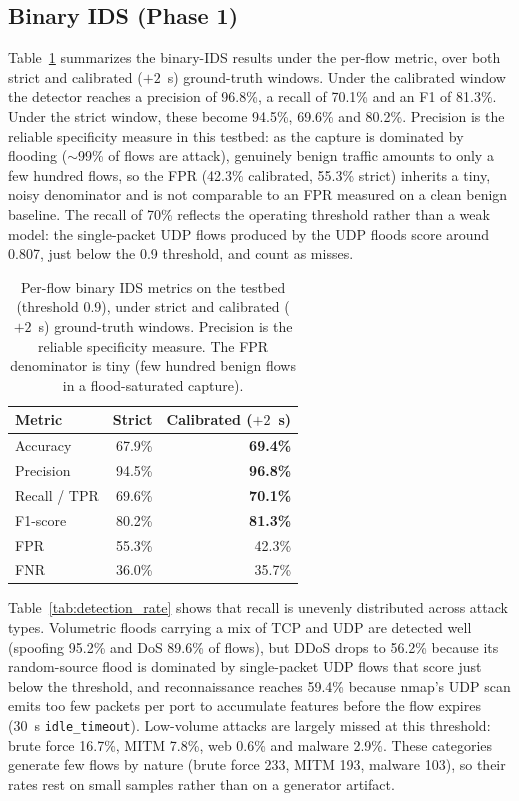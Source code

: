 \documentclass[conference]{IEEEtran}
\begin{document}
\subsection{Binary IDS (Phase 1)}
\label{subsec:res_bin}

Table~\ref{tab:bin_metrics} summarizes the binary-IDS results under the per-flow metric, over both strict and calibrated ($+2$~s) ground-truth windows. Under the calibrated window the detector reaches a precision of 96.8\%, a recall of 70.1\% and an F1 of 81.3\%. Under the strict window, these become 94.5\%, 69.6\% and 80.2\%. Precision is the reliable specificity measure in this testbed: as the capture is dominated by flooding ($\sim$99\% of flows are attack), genuinely benign traffic amounts to only a few hundred flows, so the FPR (42.3\% calibrated, 55.3\% strict) inherits a tiny, noisy denominator and is not comparable to an FPR measured on a clean benign baseline. The recall of 70\% reflects the operating threshold rather than a weak model: the single-packet UDP flows produced by the UDP floods score around 0.807, just below the 0.9 threshold, and count as misses.

\begin{table}[t]
\centering
\caption{Per-flow binary IDS metrics on the testbed (threshold 0.9), under strict
and calibrated ($+2$~s) ground-truth windows. Precision is the reliable
specificity measure. The FPR denominator is tiny (few hundred benign flows in a
flood-saturated capture).}
\label{tab:bin_metrics}
\footnotesize
\begin{tabular}{@{}lrr@{}}
\toprule
\textbf{Metric} & \textbf{Strict} & \textbf{Calibrated ($+2$~s)} \\ \midrule
Accuracy        & 67.9\% & \textbf{69.4\%} \\
Precision       & 94.5\% & \textbf{96.8\%} \\
Recall / TPR    & 69.6\% & \textbf{70.1\%} \\
F1-score        & 80.2\% & \textbf{81.3\%} \\
FPR             & 55.3\% & 42.3\% \\
FNR             & 36.0\% & 35.7\% \\
\bottomrule
\end{tabular}
\end{table}

Table~\ref{tab:detection_rate} shows that recall is unevenly distributed across attack types. Volumetric floods carrying a mix of TCP and UDP are detected well (spoofing 95.2\% and DoS 89.6\% of flows), but DDoS drops to 56.2\% because its random-source flood is dominated by single-packet UDP flows that score just below the threshold, and reconnaissance reaches 59.4\% because nmap's UDP scan emits too few packets per port to accumulate features before the flow expires (30~s \texttt{idle\_timeout}). Low-volume attacks are largely missed at this threshold: brute force 16.7\%, MITM 7.8\%, web 0.6\% and malware 2.9\%. These categories generate few flows by nature (brute force 233, MITM 193, malware 103), so their rates rest on small samples rather than on a generator artifact.
\end{document}

